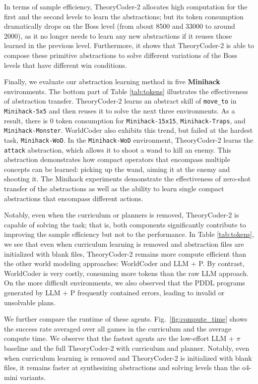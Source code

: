 \documentclass{article}
\theoremstyle{plain}
\theoremstyle{definition}
\theoremstyle{remark}
\begin{document}
In terms of sample efficiency, TheoryCoder-2 allocates high computation for the first and the second levels to learn the abstractions; but its token consumption dramatically drops on the Boss level (from about 8500 and 33000 to around 2000), as it no longer needs to learn any new abstractions if it reuses those learned in the previous level. Furthermore, it shows that TheoryCoder-2 is able to compose these primitive abstractions to solve different variations of the Boss levels that have different win conditions.

Finally, we evaluate our abstraction learning method in five \textbf{Minihack} environments. The bottom part of Table \ref{tab:tokens} illustrates the effectiveness of abstraction transfer. TheoryCoder-2 learns an abstract skill of \texttt{move\_to} in \texttt{Minihack-5x5} and then reuses it to solve the next three environments. As a result, there is 0 token consumption for \texttt{Minihack-15x15}, \texttt{Minihack-Traps}, and \texttt{Minihack-Monster}.
WorldCoder also exhibits this trend, but failed at the hardest task, \texttt{Minihack-WoD}.
In the \texttt{Minihack-WoD} environment, TheoryCoder-2 learns the \texttt{attack} abstraction, which allows it to shoot a wand to kill an enemy. This abstraction demonstrates how compact operators that encompass multiple concepts can be learned: picking up the wand, aiming it at the enemy and shooting it. The Minihack experiments demonstrate the effectiveness of zero-shot transfer of the abstractions as well as the ability to learn single compact abstractions that encompass different actions.


Notably, even when the curriculum or planners is removed, TheoryCoder-2 is capable of solving the task; that is, both components significantly contribute to improving the sample efficiency but not to the performance. In Table \ref{tab:tokens}, we see that even when curriculum learning is removed and abstraction files are initialized with blank files, TheoryCoder-2 remains more compute efficient than the other world modeling approaches: WorldCoder and LLM + P. By contrast, WorldCoder is very costly, consuming more tokens than the raw LLM approach. On the more difficult environments, we also observed that the PDDL programs generated by LLM + P frequently contained errors, leading to invalid or unsolvable plans.

We further compare the  runtime of these agents. Fig.~\ref{fig:compute_time} shows the success rate averaged over all  games in the curriculum and the average compute time.
We observe that the fastest agents are the low-effort LLM + $\pi$ baseline and the full TheoryCoder-2 with curriculum and planner. Notably, even when curriculum learning is removed and TheoryCoder-2 is initialized with blank files, it remains faster at synthesizing abstractions and solving levels than the o4-mini variants.
\end{document}
